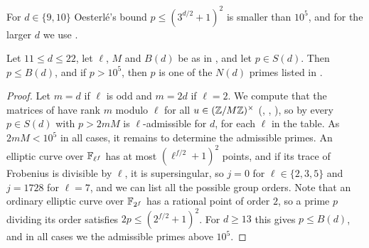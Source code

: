 For $d\in\{9,10\}$ Oesterl\'e's bound $p\leq(3^{d/2}+1)^2$ \cite[Theorem 6.1]{DKSS} is smaller than $10^5$, and for the larger $d$ we use .

\begin{corollary}\label{cor:bound}
Let $11\leq d\leq 22$, let $\ell$, $M$ and $B(d)$ be as in , and let $p\in S(d)$. Then $p\leq B(d)$, and if $p>10^5$, then $p$ is one of the $N(d)$ primes listed in .
\end{corollary}

\begin{proof}
Let $m=d$ if $\ell$ is odd and $m=2d$ if $\ell=2$. We compute that the matrices of  have rank $m$ modulo $\ell$ for all $u\in(\mathbb{Z}/M\mathbb{Z})^\times$ (, , ), so by  every $p\in S(d)$ with $p>2mM$ is $\ell$-admissible for $d$, for each $\ell$ in the table. As $2mM<10^5$ in all cases, it remains to determine the admissible primes. An elliptic curve over $\mathbb{F}_{\ell^f}$ has at most $(\ell^{f/2}+1)^2$ points, and if its trace of Frobenius is divisible by $\ell$, it is supersingular, so $j=0$ for $\ell\in\{2,3,5\}$ and $j=1728$ for $\ell=7$, and we can list all the possible group orders. Note that an ordinary elliptic curve over $\mathbb{F}_{2^f}$ has a rational point of order $2$, so a prime $p$ dividing its order satisfies $2p\leq(2^{f/2}+1)^2$. For $d\geq 13$ this gives $p\leq B(d)$, and in all cases we  the admissible primes above $10^5$.
\end{proof}

